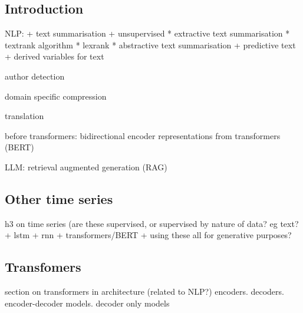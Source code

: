 
\subsection{Introduction}

NLP:
+ text summarisation
  + unsupervised
    * extractive text summarisation
      * textrank algorithm
      * lexrank
    * abstractive text summarisation
+ predictive text
+ derived variables for text

author detection

domain specific compression

translation

before transformers: bidirectional encoder representations from transformers (BERT)

LLM: retrieval augmented generation (RAG)

\subsection{Other time series}
h3 on time series (are these supervised, or supervised by nature of data? eg text?
+ lstm
+ rnn
+ transformers/BERT
+ using these all for generative purposes?
\subsection{Transfomers}
section on transformers in architecture (related to NLP?)
encoders. decoders. encoder-decoder models. decoder only models

